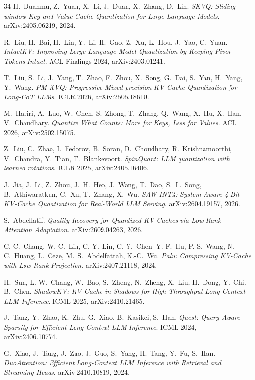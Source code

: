 \documentclass[10pt,twocolumn]{article}
\begin{document}
\begin{thebibliography}{34}
H.~Duanmu, Z.~Yuan, X.~Li, J.~Duan, X.~Zhang, D.~Lin.
\emph{SKVQ: Sliding-window Key and Value Cache Quantization for Large Language Models}.
arXiv:2405.06219, 2024.

R.~Liu, H.~Bai, H.~Lin, Y.~Li, H.~Gao, Z.~Xu, L.~Hou, J.~Yao, C.~Yuan.
\emph{IntactKV: Improving Large Language Model Quantization by Keeping Pivot Tokens Intact}.
ACL Findings 2024, arXiv:2403.01241.

T.~Liu, S.~Li, J.~Yang, T.~Zhao, F.~Zhou, X.~Song, G.~Dai, S.~Yan, H.~Yang, Y.~Wang.
\emph{PM-KVQ: Progressive Mixed-precision KV Cache Quantization for Long-CoT LLMs}.
ICLR 2026, arXiv:2505.18610.

M.~Hariri, A.~Luo, W.~Chen, S.~Zhong, T.~Zhang, Q.~Wang, X.~Hu, X.~Han, V.~Chaudhary.
\emph{Quantize What Counts: More for Keys, Less for Values}.
ACL 2026, arXiv:2502.15075.

Z.~Liu, C.~Zhao, I.~Fedorov, B.~Soran, D.~Choudhary, R.~Krishnamoorthi, V.~Chandra, Y.~Tian, T.~Blankevoort.
\emph{SpinQuant: LLM quantization with learned rotations}.
ICLR 2025, arXiv:2405.16406.

J.~Jia, J.~Li, Z.~Zhou, J.~H.~Heo, J.~Wang, T.~Dao, S.~L.~Song, B.~Athiwaratkun, C.~Xu, T.~Zhang, X.~Wu.
\emph{SAW-INT4: System-Aware 4-Bit KV-Cache Quantization for Real-World LLM Serving}.
arXiv:2604.19157, 2026.

S.~Abdellatif.
\emph{Quality Recovery for Quantized KV Caches via Low-Rank Attention Adaptation}.
arXiv:2609.04263, 2026.

C.-C.~Chang, W.-C.~Lin, C.-Y.~Lin, C.-Y.~Chen, Y.-F.~Hu, P.-S.~Wang, N.-C.~Huang, L.~Ceze, M.~S.~Abdelfattah, K.-C.~Wu.
\emph{Palu: Compressing KV-Cache with Low-Rank Projection}.
arXiv:2407.21118, 2024.

H.~Sun, L.-W.~Chang, W.~Bao, S.~Zheng, N.~Zheng, X.~Liu, H.~Dong, Y.~Chi, B.~Chen.
\emph{ShadowKV: KV Cache in Shadows for High-Throughput Long-Context LLM Inference}.
ICML 2025, arXiv:2410.21465.

J.~Tang, Y.~Zhao, K.~Zhu, G.~Xiao, B.~Kasikci, S.~Han.
\emph{Quest: Query-Aware Sparsity for Efficient Long-Context LLM Inference}.
ICML 2024, arXiv:2406.10774.

G.~Xiao, J.~Tang, J.~Zuo, J.~Guo, S.~Yang, H.~Tang, Y.~Fu, S.~Han.
\emph{DuoAttention: Efficient Long-Context LLM Inference with Retrieval and Streaming Heads}.
arXiv:2410.10819, 2024.


\end{thebibliography}
\end{document}
